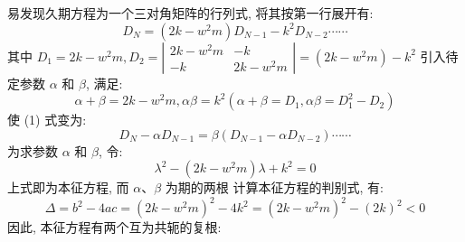 \documentclass[11pt, a4paper, oneside]{ctexart}
\begin{document}
{{{\begin{appendices}
{易发现久期方程为一个三对角矩阵的行列式, 将其按第一行展开有:
$$
D_{N}=\left(2 k-w^{2} m\right) D_{N-1}-k^{2} D_{N-2} \cdots \cdots
$$
其中 $D_{1}=2 k-w^{2} m, D_{2}=\left|\begin{array}{cc}2 k-w^{2} m & -k \\ -k & 2 k-w^{2} m\end{array}\right|=\left(2 k-w^{2} m\right)-k^{2}$ 引入待定参数 $\alpha$ 和 $\beta$, 满足:
$$
\alpha+\beta=2 k-w^{2} m, \alpha \beta=k^{2}\left(\alpha+\beta=D_{1}, \alpha \beta=D_{1}^{2}-D_{2}\right)
$$
使 (1) 式变为:
$$
D_{N}-\alpha D_{N-1}=\beta\left(D_{N-1}-\alpha D_{N-2}\right) \cdots \cdots
$$
为求参数 $\alpha$ 和 $\beta$, 令:
$$
\lambda^{2}-\left(2 k-w^{2} m\right) \lambda+k^{2}=0
$$
上式即为本征方程, 而 $\alpha 、 \beta$ 为期的两根
计算本征方程的判别式, 有:
$$
\Delta=b^{2}-4 a c=\left(2 k-w^{2} m\right)^{2}-4 k^{2}=\left(2 k-w^{2} m\right)^{2}-(2 k)^{2}<0
$$
因此, 本征方程有两个互为共轭的复根:

}
\end{appendices}}}}
\end{document}
